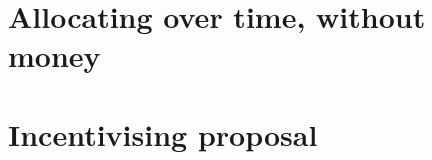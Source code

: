 \documentclass[11pt,letterpaper,reqno,oneside]{book}
\begin{document}
\chapter{Allocating over time, without money}
\label{ch3}






\chapter{Incentivising proposal}
\label{ch4}















\end{document}
